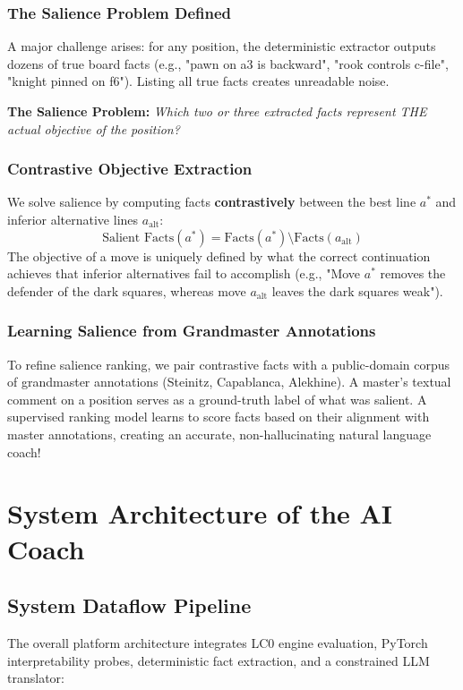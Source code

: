 \documentclass[11pt,a4paper]{report}
\begin{document}
\subsection{The Salience Problem Defined}
A major challenge arises: for any position, the deterministic extractor outputs dozens of true board facts (e.g., "pawn on a3 is backward", "rook controls c-file", "knight pinned on f6"). Listing all true facts creates unreadable noise.

\textbf{The Salience Problem:} \textit{Which two or three extracted facts represent THE actual objective of the position?}

\subsection{Contrastive Objective Extraction}
We solve salience by computing facts \textbf{contrastively} between the best line $a^*$ and inferior alternative lines $a_{\text{alt}}$:
\begin{equation}
\text{Salient Facts}(a^*) = \text{Facts}(a^*) \setminus \text{Facts}(a_{\text{alt}})
\end{equation}
The objective of a move is uniquely defined by what the correct continuation achieves that inferior alternatives fail to accomplish (e.g., "Move $a^*$ removes the defender of the dark squares, whereas move $a_{\text{alt}}$ leaves the dark squares weak").

\subsection{Learning Salience from Grandmaster Annotations}
To refine salience ranking, we pair contrastive facts with a public-domain corpus of grandmaster annotations (Steinitz, Capablanca, Alekhine). A master's textual comment on a position serves as a ground-truth label of what was salient. A supervised ranking model learns to score facts based on their alignment with master annotations, creating an accurate, non-hallucinating natural language coach!

\newpage
\chapter{System Architecture of the AI Coach}

\section{System Dataflow Pipeline}
The overall platform architecture integrates LC0 engine evaluation, PyTorch interpretability probes, deterministic fact extraction, and a constrained LLM translator:
\end{document}
